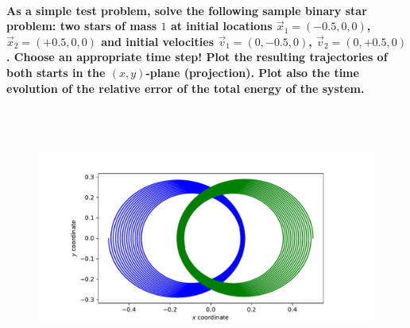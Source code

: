     \paragraph{As a simple test problem, solve the following sample binary 
        star problem: two stars of mass $1$ at initial locations 
        $\vec x_1=(-0.5,0,0)$, $\vec x_2=(+0.5,0,0)$ and initial velocities
        $\vec v_1=(0,-0.5,0)$, $\vec v_2=(0,+0.5,0)$. Choose an appropriate
        time step! Plot the resulting trajectories of both starts in the 
        $(x,y)$-plane (projection). Plot also the time evolution of the 
        relative error of the total energy of the system.
    } \ \\
        \\
        \begin{figure}[h!]
            \centering
            \includegraphics[width=\textwidth]{./figures/task2_2body.pdf}
            \caption{}
        \end{figure} \ \\ 

    \newpage
